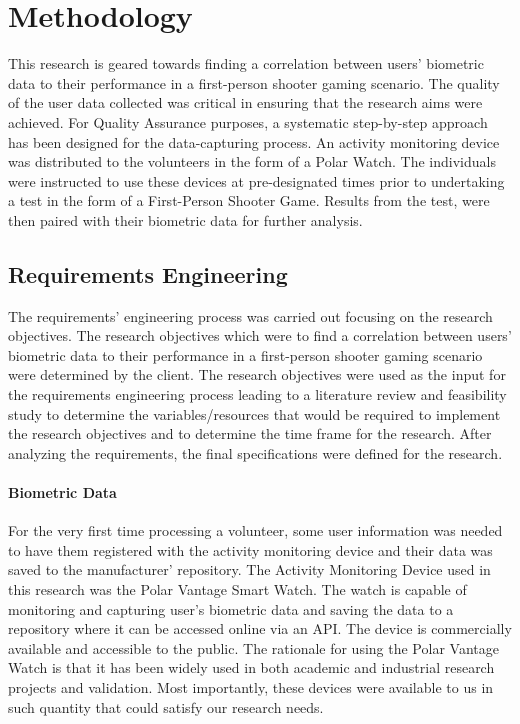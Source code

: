 \chapter{Methodology}

This research is geared towards finding a correlation between users' biometric data to their performance in a first-person shooter gaming scenario. The quality of the user data 
collected was critical in ensuring that the research aims were achieved. For Quality Assurance purposes, a systematic step-by-step approach has been designed for the data-capturing 
process. An activity monitoring device was distributed to the volunteers in the form of a Polar Watch. The individuals were instructed to use these devices at pre-designated times 
prior to undertaking a test in the form of a First-Person Shooter Game. Results from the test, were then paired with their biometric data for further analysis.

\section{Requirements Engineering}
The requirements' engineering process was carried out focusing on the research objectives. 
The research objectives which were to find a correlation between users' biometric data to their performance in a first-person shooter gaming scenario were determined by the client. 
The research objectives were used as the input for the requirements engineering process leading to a literature review and feasibility study to determine the variables/resources that 
would be required to implement the research objectives and to determine the time frame for the research. After analyzing the requirements, the final specifications were defined for 
the research. 

\subsubsection*{Biometric Data}

For the very first time processing a volunteer, some user information was needed to have them registered with the activity monitoring device and their data was saved to the manufacturer'
repository. The Activity Monitoring Device used in this research was the Polar Vantage Smart Watch. The watch is capable of monitoring and capturing user’s biometric data and saving the
data to a repository where it can be accessed online via an API. The device is commercially available and accessible to the public. The rationale for using the Polar Vantage Watch is
that it has been widely used in both academic and industrial research projects and validation. Most importantly, these devices were available to us in such quantity that could satisfy
our research needs.

